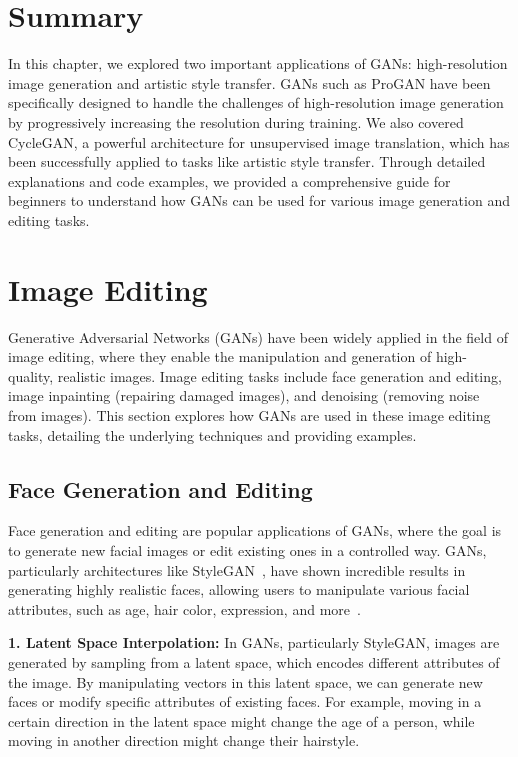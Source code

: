 \section{Summary}
In this chapter, we explored two important applications of GANs: high-resolution image generation and artistic style transfer. GANs such as ProGAN have been specifically designed to handle the challenges of high-resolution image generation by progressively increasing the resolution during training. We also covered CycleGAN, a powerful architecture for unsupervised image translation, which has been successfully applied to tasks like artistic style transfer. Through detailed explanations and code examples, we provided a comprehensive guide for beginners to understand how GANs can be used for various image generation and editing tasks.










\section{Image Editing}
Generative Adversarial Networks (GANs) have been widely applied in the field of image editing, where they enable the manipulation and generation of high-quality, realistic images. Image editing tasks include face generation and editing, image inpainting (repairing damaged images), and denoising (removing noise from images). This section explores how GANs are used in these image editing tasks, detailing the underlying techniques and providing examples.

\subsection{Face Generation and Editing}
Face generation and editing are popular applications of GANs, where the goal is to generate new facial images or edit existing ones in a controlled way. GANs, particularly architectures like StyleGAN~\cite{karras2019style}, have shown incredible results in generating highly realistic faces, allowing users to manipulate various facial attributes, such as age, hair color, expression, and more~\cite{patashnik2021styleclip}.

\textbf{1. Latent Space Interpolation:}  
In GANs, particularly StyleGAN, images are generated by sampling from a latent space, which encodes different attributes of the image. By manipulating vectors in this latent space, we can generate new faces or modify specific attributes of existing faces. For example, moving in a certain direction in the latent space might change the age of a person, while moving in another direction might change their hairstyle.

